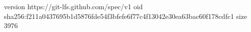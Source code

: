 version https://git-lfs.github.com/spec/v1
oid sha256:f211a0437695b1d5876fde54f3bfefe6f77c4f13042e30ea63bac60f178cdfc1
size 3976
